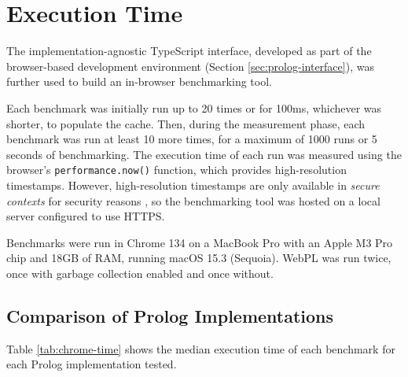 \section{Execution Time}

\label{sec:execution-time}

The implementation-agnostic TypeScript interface, developed as part of the browser-based development environment (Section \ref{sec:prolog-interface}), was further used to build an in-browser benchmarking tool.

Each benchmark was initially run up to 20 times or for 100ms, whichever was shorter, to populate the cache. Then, during the measurement phase, each benchmark was run at least 10 more times, for a maximum of 1000 runs or 5 seconds of benchmarking. The execution time of each run was measured using the browser's \texttt{performance.now()} function, which provides high-resolution timestamps. However, high-resolution timestamps are only available in \emph{secure contexts} for security reasons \cite{sanchez-rolaClockClockTimeBased2018}, so the benchmarking tool was hosted on a local server configured to use HTTPS.

Benchmarks were run in Chrome 134 on a MacBook Pro with an Apple M3 Pro chip and 18GB of RAM, running macOS 15.3 (Sequoia). WebPL was run twice, once with garbage collection enabled and once without.

\subsection{Comparison of Prolog Implementations}

\label{sec:prolog-comparison}

Table \ref{tab:chrome-time} shows the median execution time of each benchmark for each Prolog implementation tested.

